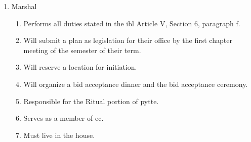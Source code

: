 \begin{enumerate}
\begin{enumerate}
				\item Will send taxes by certified mail, and will distribute this certification to the \gls{cab} financial advisor, alumni housing corporation financial advisor, and \gls{ec}.
				\item Will retain a physical and electronic backup of financial records for no fewer than five years.
                		\item Maintain a changelog of the budget.
               		 	\item Give a monthly financial report to the chapter and deliver the report to CAB.
               		 	\item The Treasurer cannot be elected or appointed to a position which has permission
to spend from the budget.
				\item Cannot be elected to another position during their term.
				\item A candidate for the position of Treasurer must be interviewed by the CAB prior to the
election. A simple majority vote of the CAB may veto that candidate. This veto can be overruled
by a supermajority vote of the chapter. Failure for CAB to meet with a candidate prior to
elections will be interpreted as CAB waiving their right to interview the candidate.
				\item Serves as a member of \gls{ec}.
				\item Must live in the house.
			\end{enumerate}

		\item Marshal
			\begin{enumerate}
				\item Performs all duties stated in the \gls{ibl} Article V, Section 6, paragraph f.
				\item Will submit a plan as legislation for their office by the first chapter meeting of the semester of their term.
				\item Will reserve a location for initiation.
                		\item Will organize a bid acceptance dinner and the bid acceptance ceremony.
				\item Responsible for the Ritual portion of \gls{pytte}.
				\item Serves as a member of \gls{ec}.
				\item Must live in the house.
			\end{enumerate}


\end{enumerate}
